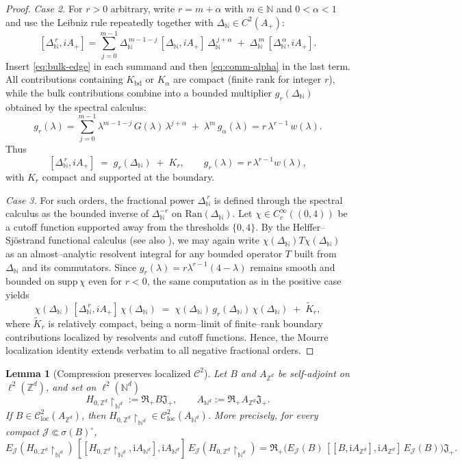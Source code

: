 \documentclass[10pt]{amsart}
\newcommand{\Z}{{\mathbb{Z}}}
\newcommand{\N}{{\mathbb{N}}}
\newcommand{\1}{{\mathbb{I}}}
\newcommand{\Jc}{\mathcal{J}}
\numberwithin{equation}{section}
\newtheorem{lemma}[theorem]{Lemma}%
\begin{document}
\begin{proof}
\smallskip
\emph{Case 2.}
For $r>0$ arbitrary, write $r=m+\alpha$ with $m\in\N$ and $0<\alpha<1$ and use
the Leibniz rule repeatedly together with $\Delta_{\N}\in C^2(A_+)$:
\[
[\Delta_{\N}^{\,r},iA_+]
= \sum_{j=0}^{m-1} \Delta_{\N}^{\,m-1-j}\,[\Delta_{\N},iA_+]\,\Delta_{\N}^{\,j+\alpha}
\;+\; \Delta_{\N}^{\,m}\,[\Delta_{\N}^{\,\alpha},iA_+].
\]
Insert \eqref{eq:bulk-edge} in each summand and then \eqref{eq:comm-alpha} in the
last term. All contributions containing $K_{\mathrm{bd}}$ or $K_\alpha$ are
compact (finite rank for integer $r$), while the bulk contributions combine into
a bounded multiplier $g_r(\Delta_{\N})$ obtained by the spectral calculus:
\[
g_r(\lambda)
= \sum_{j=0}^{m-1} \lambda^{m-1-j}\,G(\lambda)\,\lambda^{j+\alpha}
\;+\; \lambda^{m}\,g_\alpha(\lambda)
= r\,\lambda^{r-1}\,w(\lambda).
\]
Thus
\begin{equation}\label{eq:main-comm}
[\Delta_{\N}^{\,r},iA_+] \;=\; g_r(\Delta_{\N}) \;+\; K_r,
\qquad g_r(\lambda)= r\,\lambda^{r-1}w(\lambda),
\end{equation}
with $K_r$ compact and supported at the boundary.

\smallskip
\emph{Case 3.}
For such orders, the fractional power $\Delta_{\N}^{\,r}$ is defined through the spectral calculus as the bounded inverse of $\Delta_{\N}^{-r}$ on $\mathrm{Ran}(\Delta_{\N})$.
Let $\chi\in C_c^\infty((0,4))$ be a cutoff function supported away from the thresholds $\{0,4\}$.
By the Helffer--Sjöstrand functional calculus
\cite{HelfferSjostrand1989} (see also \cite[\S~4.7]{Davies1995}),
we may again write $\chi(\Delta_{\N})T\chi(\Delta_{\N})$ as an almost--analytic resolvent integral for any bounded operator $T$ built from $\Delta_{\N}$ and its commutators.
Since $g_r(\lambda)=r\lambda^{r-1}(4-\lambda)$ remains smooth and bounded on $\mathrm{supp}\,\chi$ even for $r<0$, the same computation as in the positive case yields
\[
\chi(\Delta_{\N})\,[\Delta_{\N}^{\,r},iA_+]\,\chi(\Delta_{\N})
\;=\;
\chi(\Delta_{\N})\,g_r(\Delta_{\N})\,\chi(\Delta_{\N})
\;+\; \widetilde K_r,
\]
where $\widetilde K_r$ is relatively compact, being a norm--limit of finite--rank boundary contributions localized by resolvents and cutoff functions.
Hence, the Mourre localization identity extends verbatim to all negative fractional orders.

\end{proof}


\begin{lemma}[Compression preserves localized $\mathcal{C}^2$]\label{lem:compression-C2}
Let $B$ and $A_{\Z^d}$ be self-adjoint on $\ell^2(\Z^d)$, and set on $\ell^2(\N^d)$
\[
H_{0,\Z^d}\!\restriction_{\N^d}:=\mathfrak{R}_+ B \mathfrak{J}_+,\qquad A_{\N^d}:=\mathfrak{R}_+ A_{\Z^d} \mathfrak{J}_+.
\]
If $B\in\mathcal{C}^2_{\mathrm{loc}}(A_{\Z^d})$, then $H_{0,\Z^d}\!\restriction_{\N^d}\in\mathcal{C}^2_{\mathrm{loc}}(A_{\N^d})$.
More precisely, for every compact $\Jc\Subset\sigma(B)^\circ$,
\[
E_\Jc(H_{0,\Z^d}\!\restriction_{\N^d})\, [[H_{0,\Z^d}\!\restriction_{\N^d},\mathrm{i}A_{\N^d}],\mathrm{i}A_{\N^d}]\,E_\Jc(H_{0,\Z^d}\!\restriction_{\N^d})
= \mathfrak{R}_+\Big(E_\Jc(B)\, [[B,\mathrm{i}A_{\Z^d}],\mathrm{i}A_{\Z^d}]\,E_\Jc(B)\Big) \mathfrak{J}_+.
\]
\end{lemma}
\end{document}
